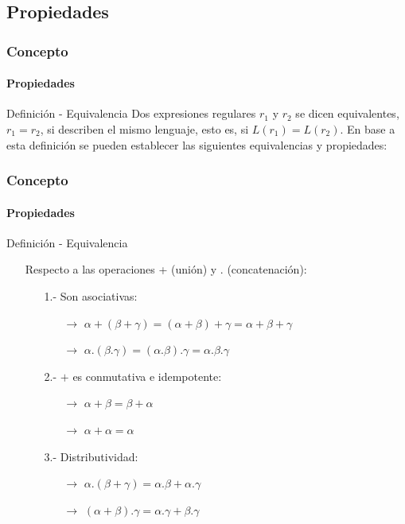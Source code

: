 \documentclass{beamer}
\begin{document}
        \subsection{Propiedades}

        \begin{frame}
			\frametitle{Concepto}
			\framesubtitle{Propiedades}

			\begin{exampleblock}{Definici\'on - Equivalencia}
			    Dos expresiones regulares $r_{1}$ y $r_{2}$ se dicen equivalentes, $r_{1} = r_{2}$, si describen el mismo lenguaje, esto es, si $L(r_{1})=L(r_{2})$. En base a esta definici\'on se pueden establecer las siguientes equivalencias y propiedades:
			\end{exampleblock}
		\end{frame}

        \begin{frame}
			\frametitle{Concepto}
			\framesubtitle{Propiedades}

			\begin{block}{Definici\'on - Equivalencia}
			    \begin{itemize}
			        \item[] Respecto a las operaciones + (uni\'on) y . (concatenaci\'on):
			        \begin{itemize}
			            \item[1.-] Son asociativas: 
			            \begin{itemize}
			                \item[$\rightarrow$] $\alpha + (\beta + \gamma) = (\alpha + \beta) + \gamma = \alpha + \beta + \gamma$
			                \item[$\rightarrow$] $\alpha.(\beta.\gamma) = (\alpha.\beta).\gamma = \alpha.\beta.\gamma$
			            \end{itemize}
			            \item[2.-] $+$ es conmutativa e idempotente: 
			            \begin{itemize}
			                \item[$\rightarrow$] $\alpha + \beta = \beta + \alpha$
			                \item[$\rightarrow$] $\alpha + \alpha = \alpha$
			            \end{itemize}
			            \item[3.-] Distributividad:
			            \begin{itemize}
			                \item[$\rightarrow$] $\alpha.(\beta + \gamma)=\alpha.\beta+\alpha.\gamma$
			                \item[$\rightarrow$] $(\alpha + \beta).\gamma = \alpha.\gamma + \beta.\gamma$
			            \end{itemize}
			        \end{itemize}
			    \end{itemize}
			\end{block}
		\end{frame}
\end{document}
